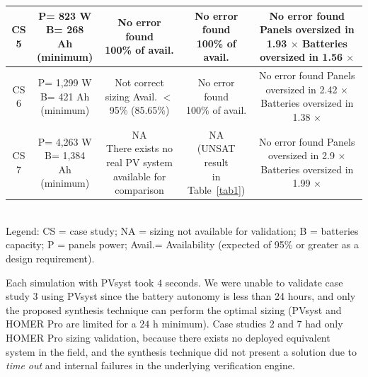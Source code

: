 \documentclass[runningheads]{llncs}
\begin{document}
\begin{table}
\begin{scriptsize}
\begin{tabular}{c|c|c|c|c}
\hline
CS 5 & \makecell{P= 823 W\\B= 268 Ah\\(minimum)} & \makecell{No error found \\100\% of avail.} & \makecell{No error found \\100\% of avail.} & \makecell{No error found\\Panels oversized in 1.93 $\times$\\Batteries oversized in 1.56 $\times$}\\
\hline
CS 6 & \makecell{P= 1,299 W\\B= 421 Ah\\(minimum)} & \makecell{Not correct sizing \\Avail. $<$ 95\%\\(85.65\%)} & \makecell{No error found \\100\% of avail.} & \makecell{No error found\\Panels oversized in 2.42 $\times$\\Batteries oversized in 1.38 $\times$}\\
\hline
CS 7 & \makecell{P= 4,263 W\\B= 1,384 Ah\\(minimum)} & \makecell{NA\\There exists no real PV system\\available for comparison} & \makecell{NA \\(UNSAT result\\in Table~\ref{tab1})} & \makecell{No error found\\Panels oversized in 2.9 $\times$\\Batteries oversized in 1.99 $\times$}\\
\hline
\hline
\end{tabular}
\\Legend: CS = case study; NA = sizing not available for validation; B = batteries capacity; P = panels power; Avail.= Availability (expected of 95\% or greater as a design requirement).
\end{scriptsize}
\end{table}

Each simulation with PVsyst took $4$ seconds. We were unable to validate case study $3$ using PVsyst since the battery autonomy is less than 24 hours, and only the proposed synthesis technique can perform the optimal sizing (PVsyst and HOMER Pro are limited for a $24$ h minimum). Case studies $2$ and $7$ had only HOMER Pro sizing validation, because there exists no deployed equivalent system in the field, and the synthesis technique did not present a solution due to \textit{time out} and internal failures in the underlying verification engine. %
\end{document}
